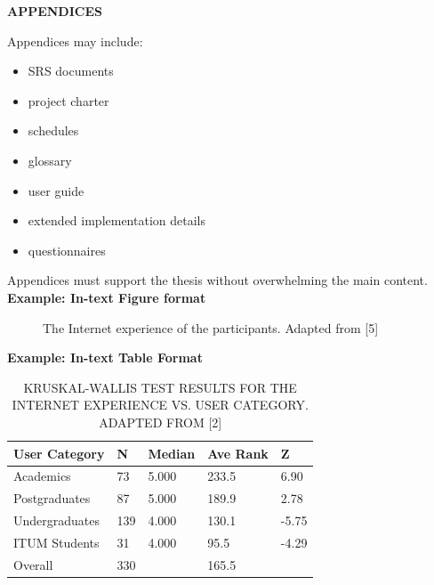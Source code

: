 \documentclass[12pt, a4paper]{report}
\begin{document}
\clearpage
{}
\begin{center}
    \textbf{APPENDICES}
\end{center}
\vspace{0.2in}
Appendices may include:
\begin{itemize}
    \item SRS documents
    \item project charter
    \item schedules
    \item glossary
    \item user guide
    \item extended implementation details
    \item questionnaires
\end{itemize}
Appendices must support the thesis without overwhelming the main content.\\[0.5in]

\noindent \textbf{Example: In-text Figure format}\\[0.2in]
\begin{figure}[h!]
    \centering
    \caption{The Internet experience of the participants. Adapted from [5]}
\end{figure}

\clearpage
\noindent \textbf{Example: In-text Table Format}\\[0.2in]
\begin{table}[h!]
    \centering
    \caption{KRUSKAL-WALLIS TEST RESULTS FOR THE INTERNET EXPERIENCE VS. USER CATEGORY. ADAPTED FROM [2]}
    \vspace{0.1in}
    \begin{tabular}{p{1.5in} l l l l}
    \hline
    User Category & N & Median & Ave Rank & Z \\
    \hline
    Academics & 73 & 5.000 & 233.5 & 6.90 \\
    Postgraduates & 87 & 5.000 & 189.9 & 2.78 \\
    Undergraduates & 139 & 4.000 & 130.1 & -5.75 \\
    ITUM Students & 31 & 4.000 & 95.5 & -4.29 \\
    Overall & 330 & & 165.5 & \\
    \hline
    \end{tabular}
\end{table}
\end{document}
